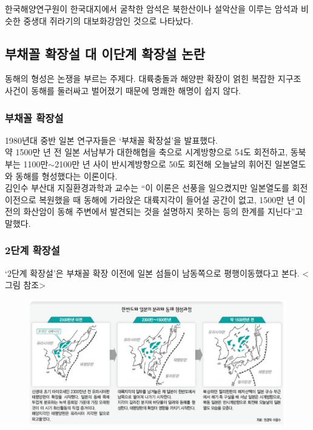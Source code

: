 \documentclass[12pt,a4paper]{book}
\newcommand{\SubSectionMargin}		{\newpage  \null \vskip 0cm}
\begin{document}
		한국해양연구원이 한국대지에서 굴착한 암석은 북한산이나 설악산을 이루는 암석과 비슷한 중생대 쥐라기의 대보화강암인 것으로 나타났다.
 
		\SubSectionMargin
		\subsection{부채꼴 확장설 대 이단계 확장설 논란}
 
		동해의 형성은 논쟁을 부르는 주제다. 
		대륙충돌과 해양판 확장이 얽힌 복잡한 지구조 사건이 동해를 둘러싸고 벌어졌기 때문에 명쾌한 해명이 쉽지 않다.
		\\[-1.0em]
 
		\subsubsection{부채꼴 확장설}

		1980년대 중반 일본 연구자들은 ‘부채꼴 확장설’을 발표했다. 
		\\[-1.0em]

		약 1500만 년 전 일본 서남부가 대한해협을 축으로 시계방향으로 54도 회전하고, 
		동북부는 1100만$\sim$2100만 년 사이 반시계방향으로 50도 회전해 오늘날의 휘어진 일본열도와 동해를 형성했다는 이론이다.
		\\[-1.0em]
 
		김인수 부산대 지질환경과학과 교수는 “이 이론은 선풍을 일으켰지만 
		일본열도를 회전 이전으로 복원했을 때 동해에 가라앉은 대륙지각이 들어설 공간이 없고, 
		1500만 년 이전의 화산암이 동해 주변에서 발견되는 것을 설명하지 못하는 등의 한계를 지닌다”고 말했다.
 
		\subsubsection{2단계 확장설}

		‘2단계 확장설’은 부채꼴 확장 이전에 일본 섬들이 남동쪽으로 평행이동했다고 본다. <그림 참조>
		
		\begin{figure}[h!] 
		\includegraphics[width=1.0\textwidth]{./fig/rain_26690.pdf}
		\end{figure}
\end{document}
